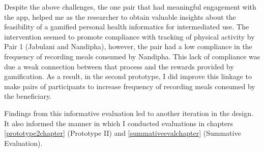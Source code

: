Despite the above challenges, the one pair that had meaningful engagement with the app, helped me as the researcher to obtain valuable insights about the feasibility of a gamified personal health informatics for intermediated use. The intervention seemed to promote compliance with tracking of physical activity by Pair 1 (Jabulani and Nandipha), however, the pair had a low compliance in the frequency of recording meals consumed by Nandipha. This lack of compliance was due a weak connection between that process and the rewards provided by gamification. As a result, in the second prototype, I did improve this linkage to make pairs of participants to increase frequency of recording meals consumed by the beneficiary.  

Findings from this informative evaluation led to another iteration in the design. It also informed the manner in which I conducted evaluations in chapters \ref{prototype2chapter} (Prototype II) and \ref{summativeevalchapter} (Summative Evaluation). 
